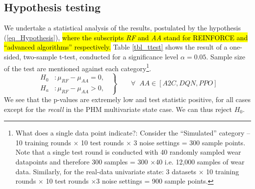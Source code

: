 \documentclass[referee, sn-mathphys-num]{sn-jnl}
\newcommand{\hlc}[2][cyan!17]{{\colorlet{foo}{#1} \sethlcolor{foo}\hl{#2}}}
\begin{document}
	\subsection{Hypothesis testing}
	We undertake a statistical analysis of the results, postulated by the hypothesis (\ref{eq_Hypothesis}), \hlc{where the subscripts \textit{RF} and \textit{AA} stand for REINFORCE and ``advanced algorithms'' respectively.} Table \ref{tbl_ttest} shows the result of a one-sided, two-sample t-test, conducted for a significance level $\alpha=0.05$. Sample size of the test are mentioned against each category\footnote{What does a single data point indicate?: Consider the ``Simulated'' category -- 10 training rounds $\times$ 10 test rounds $\times$ 3 noise settings = 300 sample points. Note that a single test round is conducted with 40 randomly sampled wear datapoints and therefore 300 samples = 300 $\times$40 i.e. 12,000 samples of wear data. Similarly, for the real-data univariate state: 3 datasets $\times$ 10 training rounds $\times$ 10 test rounds $\times$3 noise settings = 900 sample points.}.
	\begin{equation}
		\left.\begin{aligned}
			H_0 & : \mu_{RF} - \mu_{AA} = 0,\;\; \\
			H_a & : \mu_{RF} - \mu_{AA} > 0, \;\;
		\end{aligned}
		\right\}
		\qquad \forall \;\; \text{$AA \in[A2C, DQN, PPO]$}
		\label{eq_Hypothesis}
	\end{equation}
	We see that the p-values are extremely low and test statistic positive, for all cases except for the \textit{recall} in the PHM multivariate state case. We can thus reject $H_0$.
\end{document}
